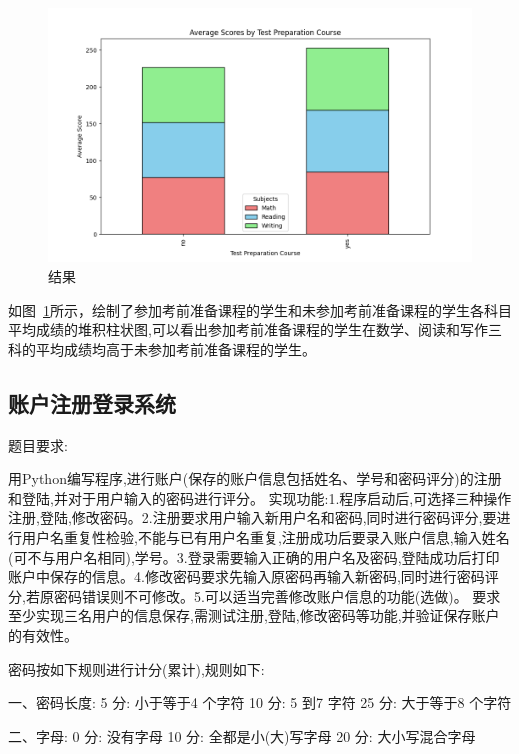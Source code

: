 \documentclass[12pt,a4paper,oneside]{article}
\begin{document}
\begin{figure}[H]
    \centering
    \begin{minipage}{0.4\textwidth}
        \centering
        \includegraphics[width=\textwidth]{image/Figure_4.png} %
        \caption{结果}
        \label{fig:image6}
    \end{minipage}
\end{figure}


如图~\ref{fig:image6}所示，绘制了参加考前准备课程的学生和未参加考前准备课程的学生各科目平均成绩的堆积柱状图,可以看出参加考前准备课程的学生在数学、阅读和写作三科的平均成绩均高于未参加考前准备课程的学生。
\subsection{账户注册登录系统}
题目要求:


用Python编写程序,进行账户(保存的账户信息包括姓名、学号和密码评分)的注册和登陆,并对于用户输入的密码进行评分。
实现功能:1.程序启动后,可选择三种操作注册,登陆,修改密码。2.注册要求用户输入新用户名和密码,同时进行密码评分,要进行用户名重复性检验,不能与已有用户名重复,注册成功后要录入账户信息,输入姓名(可不与用户名相同),学号。3.登录需要输入正确的用户名及密码,登陆成功后打印账户中保存的信息。4.修改密码要求先输入原密码再输入新密码,同时进行密码评分,若原密码错误则不可修改。5.可以适当完善修改账户信息的功能(选做)。
要求至少实现三名用户的信息保存,需测试注册,登陆,修改密码等功能,并验证保存账户的有效性。
 
密码按如下规则进行计分(累计),规则如下:

一、密码长度:
5 分: 小于等于4 个字符
10 分: 5 到7 字符
25 分: 大于等于8 个字符

二、字母:
0 分: 没有字母
10 分: 全都是小(大)写字母
20 分: 大小写混合字母
\end{document}
